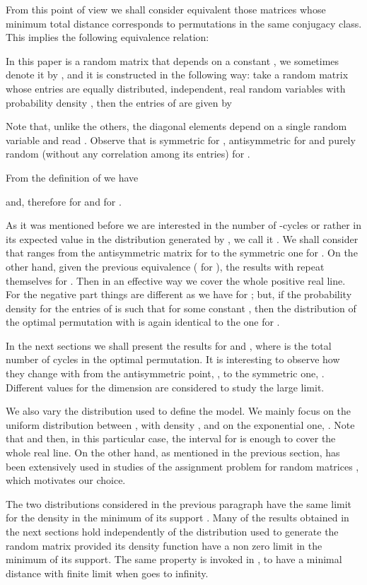\documentclass[]{iopart}
\begin{document}
{}From this point of view we shall consider equivalent those
matrices  whose minimum total distance corresponds to  
permutations in the same 
conjugacy class. This implies the following equivalence relation:


In this paper  is a random matrix that depends on a
constant , we sometimes denote it by ,
and it is constructed in the following way:
take a random   matrix  whose entries are equally 
distributed, independent, real  random variables with probability density
, then the entries of  are given by

Note that, unlike the others, the diagonal 
elements depend on a single random variable
and read .
Observe that  is symmetric for ,  
antisymmetric for  and purely random (without any correlation
among its entries) for .   

{}From the definition of  we have

and,  therefore  for 
 and  
for .

As it was mentioned before we are interested in
the number of -cycles  or rather
in its expected value in the distribution
generated by , we call it . 
We shall consider  that ranges from
the antisymmetric matrix for  
to the symmetric one for .
On the other hand, given the previous equivalence
( for ),
the results with  repeat
themselves for .
Then in an effective way we cover 
the whole positive real line.
For the negative part things are different
as we have  for ;
but, if the probability density for the entries of  is
such that  for some constant , then
the distribution of the optimal permutation with  
is again identical to the one for .

In the next sections we shall present the results for 
 and , where  is the 
total number of cycles in the optimal permutation.
It is interesting to observe how they change
with  from the antisymmetric point, ,
to the symmetric one, . 
Different values for the dimension  are considered
to study the large  limit.

We also vary the distribution  used to define the model.
We mainly focus on the uniform distribution between ,
with density , and on the exponential one, 
. 
Note that  and then, in this particular
case, the interval  for 
is enough to cover the whole
real line. On the other hand, as mentioned in the previous section, 
 has been extensively used in
studies of the assignment problem for random matrices 
\cite{P1},\cite{P5} which motivates our choice.

The two distributions considered in the previous paragraph
have the same limit for the density in the minimum
of its support . 
Many of the results obtained in the next sections hold independently 
of the distribution used to generate the random matrix provided 
its density function have a non 
zero limit in the minimum of its support. 
The same property is invoked in \cite{P1},\cite{P5}
to have a minimal distance with finite limit when 
goes to infinity.    
\end{document}
